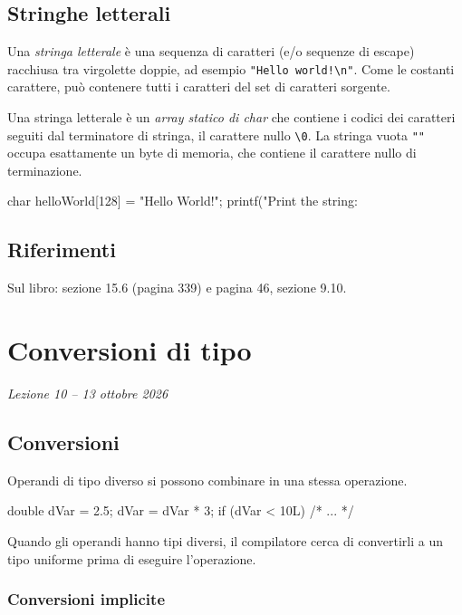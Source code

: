 \documentclass[11pt,a4paper]{article}
\begin{document}
\subsection{Stringhe letterali}

Una \emph{stringa letterale} è una sequenza di caratteri (e/o sequenze di escape) racchiusa tra virgolette doppie, ad esempio \lstinline|"Hello world!\n"|. Come le costanti carattere, può contenere tutti i caratteri del set di caratteri sorgente.

Una stringa letterale è un \emph{array statico di char} che contiene i codici dei caratteri seguiti dal terminatore di stringa, il carattere nullo \lstinline|\0|. La stringa vuota \lstinline|""| occupa esattamente un byte di memoria, che contiene il carattere nullo di terminazione.

\begin{codice}
char helloWorld[128] = "Hello World!\n";
printf("Print the string: %
\end{codice}

\subsection*{Riferimenti}

Sul libro: sezione 15.6 (pagina 339) e pagina 46, sezione 9.10.

\section[Conversioni di tipo (Lezione 10 -- 13 ottobre 2026)]{Conversioni di tipo}
\noindent\emph{Lezione 10 -- 13 ottobre 2026}
\subsection{Conversioni}

Operandi di tipo diverso si possono combinare in una stessa operazione.

\begin{codice}
double dVar = 2.5;
dVar = dVar * 3;
if (dVar < 10L) { /* ... */ }
\end{codice}

Quando gli operandi hanno tipi diversi, il compilatore cerca di convertirli a un tipo uniforme prima di eseguire l'operazione.

\subsubsection{Conversioni implicite}
\end{document}
